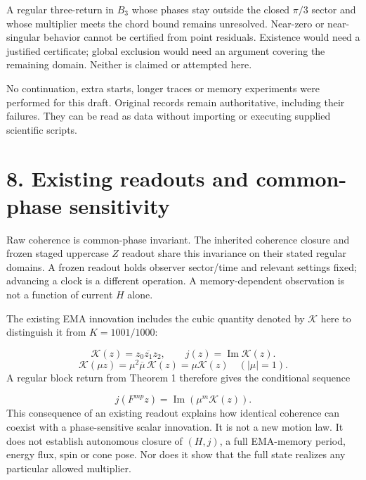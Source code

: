 \documentclass[11pt,a4paper]{article}
\begin{document}
A regular three-return in $B_3$ whose phases stay outside the closed $\pi/3$ sector and whose multiplier meets the chord bound remains unresolved. Near-zero or near-singular behavior cannot be certified from point residuals. Existence would need a justified certificate; global exclusion would need an argument covering the remaining domain. Neither is claimed or attempted here.

No continuation, extra starts, longer traces or memory experiments were performed for this draft. Original records remain authoritative, including their failures. They can be read as data without importing or executing supplied scientific scripts.

\clearpage
\section*{8. Existing readouts and common-phase sensitivity}
Raw coherence is common-phase invariant. The inherited coherence closure and frozen staged uppercase $Z$ readout share this invariance on their stated regular domains. A frozen readout holds observer sector/time and relevant settings fixed; advancing a clock is a different operation. A memory-dependent observation is not a function of current $H$ alone. \cite{OBS} \cite{Z}

The existing EMA innovation includes the cubic quantity denoted by $\mathcal{K}$ here to distinguish it from $K=1001/1000$: \cite{Z}

\begin{equation}\mathcal{K}(z)=z_0\overline{z_1}z_2,\qquad j(z)=\operatorname{Im}\mathcal{K}(z).\end{equation}
\begin{equation}\mathcal{K}(\mu z)=\mu^2\overline{\mu}\,\mathcal{K}(z)=\mu\mathcal{K}(z)\quad(|\mu|=1).\end{equation}
A regular block return from Theorem 1 therefore gives the conditional sequence

\begin{equation}j(F^{mp}z)=\operatorname{Im}\left(\mu^m\mathcal{K}(z)\right).\end{equation}
This consequence of an existing readout explains how identical coherence can coexist with a phase-sensitive scalar innovation. It is not a new motion law. It does not establish autonomous closure of $(H,j)$, a full EMA-memory period, energy flux, spin or cone pose. Nor does it show that the full state realizes any particular allowed multiplier. \cite{D02} \cite{REV02}
\end{document}
